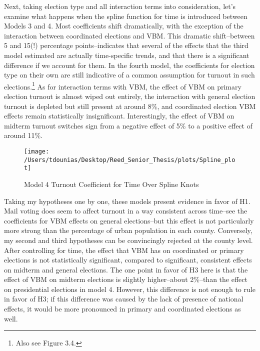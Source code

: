 \documentclass[12pt,twoside]{reedthesis}
\begin{document}
  Next, taking election type and all interaction terms into consideration,
  let's examine what happens when the spline function for time is
  introduced between Models 3 and 4. Most coefficients shift dramatically,
  with the exception of the interaction between coordinated elections and
  VBM. This dramatic shift--between 5 and 15(!) percentage
  points--indicates that several of the effects that the third model
  estimated are actually time-specific trends, and that there is a
  significant difference if we account for them. In the fourth model, the
  coefficients for election type on their own are still indicative of a
  common assumption for turnout in such elections.\footnote{Also see
    Figure 3.4.} As for interaction terms with VBM, the effect of VBM on
  primary election turnout is almost wiped out entirely, the interaction
  with general election turnout is depleted but still present at around
  8\%, and coordinated election VBM effects remain statistically
  insignificant. Interestingly, the effect of VBM on midterm turnout
  switches sign from a negative effect of 5\% to a positive effect of
  around 11\%.
  
  \begin{figure}
  
  {\centering \texttt{[image: /Users/tdounias/Desktop/Reed\_Senior\_Thesis/plots/Spline\_plot]} 
  
  }
  
  \caption[Model 4 Turnout Coefficient for Time Over Spline Knots]{Model 4 Turnout Coefficient for Time Over Spline Knots}\label{fig:time splines}
  \end{figure}
  
  Taking my hypotheses one by one, these models present evidence in favor
  of H1. Mail voting does seem to affect turnout in a way consistent
  across time--see the coefficients for VBM effects on general
  elections--but this effect is not particularly more strong than the
  percentage of urban population in each county. Conversely, my second and
  third hypotheses can be convincingly rejected at the county level. After
  controlling for time, the effect that VBM has on coordinated or primary
  elections is not statistically significant, compared to significant,
  consistent effects on midterm and general elections. The one point in
  favor of H3 here is that the effect of VBM on midterm elections is
  slightly higher--about 2\%--than the effect on presidential elections in
  model 4. However, this difference is not enough to rule in favor of H3;
  if this difference was caused by the lack of presence of national
  effects, it would be more pronounced in primary and coordinated
  elections as well.
  
\end{document}
